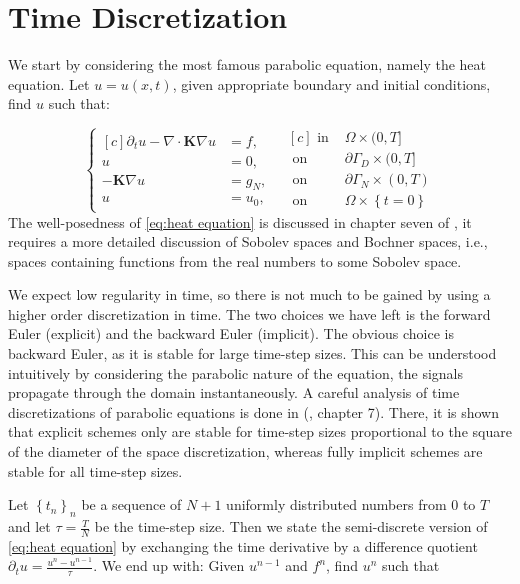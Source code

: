 \documentclass[../Main/main.tex]{subfiles}
\begin{document}
	\section*{Time Discretization}	
		We start by considering the most famous parabolic equation, namely the heat equation. Let $u = u(x,t)$, given appropriate boundary and initial conditions, find $u$ such that:
	
	\begin{equation}\label{eq:heat equation}
		\left \{
		\begin{aligned}[c]
			\partial_t u - \nabla \cdot \pmb{K} \nabla u &= f, \\
			u &= 0, \\
			-\pmb{K}\nabla u &= g_N,\\
			u &= u_0,
		\end{aligned}
		\ \ \
		\begin{aligned}[c]
			\text{ in }& \Omega \times (0,T]\\
			\text{ on }& \partial \Gamma_D \times (0,T]\\
			\text{ on }& \partial \Gamma_N \times (0,T)\\
			\text{ on }& \Omega \times \left\{t=0\right \}
		\end{aligned}
	\right.
	\end{equation}
	The well-posedness of \eqref{eq:heat equation} is discussed in chapter seven of \cite{evans10}, it requires a more detailed discussion of Sobolev spaces and Bochner spaces, i.e., spaces containing functions from the real numbers to some Sobolev space.\par
	We expect low regularity in time, so there is not much to be  gained by using a higher order discretization in time. The two choices we have left is the forward Euler (explicit) and the backward Euler (implicit). The obvious choice is backward Euler, as it is stable for large time-step sizes. This can be understood intuitively by considering the parabolic nature of the equation, the signals propagate through the domain instantaneously. A careful analysis of time discretizations of parabolic equations is done in (\cite{Knabner}, chapter 7).  There, it is shown that explicit schemes only are stable for time-step sizes proportional to the square of the diameter of the space discretization, whereas fully implicit schemes are stable for all time-step sizes. \par  Let $\left \{ t_n \right \}_n$ be a sequence of $N+1$ uniformly distributed numbers from $0$ to $T$ and let $\tau = \frac{T}{N}$ be the time-step size. Then we state the semi-discrete version of \eqref{eq:heat equation} by exchanging the time derivative by a difference quotient $\partial_t u = \frac{u^n-u^{n-1}}{\tau}$. We end up with: Given $u^{n-1}$ and $f^n$, find $u^n$ such that
\end{document}
